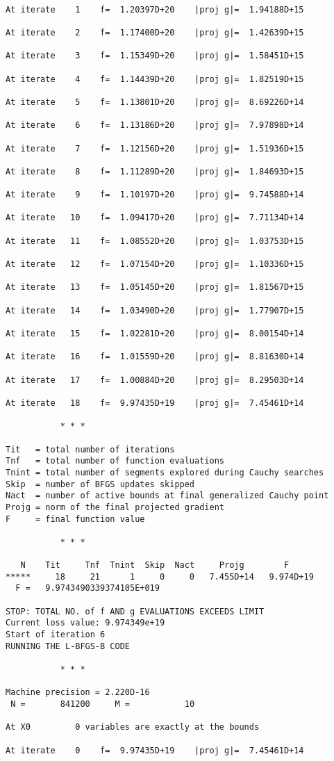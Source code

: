 \documentclass[11pt]{article}
\begin{document}
    \begin{Verbatim}[commandchars=\\\{\}]

At iterate    1    f=  1.20397D+20    |proj g|=  1.94188D+15

At iterate    2    f=  1.17400D+20    |proj g|=  1.42639D+15

At iterate    3    f=  1.15349D+20    |proj g|=  1.58451D+15

At iterate    4    f=  1.14439D+20    |proj g|=  1.82519D+15

At iterate    5    f=  1.13801D+20    |proj g|=  8.69226D+14

At iterate    6    f=  1.13186D+20    |proj g|=  7.97898D+14

At iterate    7    f=  1.12156D+20    |proj g|=  1.51936D+15

At iterate    8    f=  1.11289D+20    |proj g|=  1.84693D+15

At iterate    9    f=  1.10197D+20    |proj g|=  9.74588D+14

At iterate   10    f=  1.09417D+20    |proj g|=  7.71134D+14

At iterate   11    f=  1.08552D+20    |proj g|=  1.03753D+15

At iterate   12    f=  1.07154D+20    |proj g|=  1.10336D+15

At iterate   13    f=  1.05145D+20    |proj g|=  1.81567D+15

At iterate   14    f=  1.03490D+20    |proj g|=  1.77907D+15

At iterate   15    f=  1.02281D+20    |proj g|=  8.00154D+14

At iterate   16    f=  1.01559D+20    |proj g|=  8.81630D+14

At iterate   17    f=  1.00884D+20    |proj g|=  8.29503D+14

At iterate   18    f=  9.97435D+19    |proj g|=  7.45461D+14

           * * *

Tit   = total number of iterations
Tnf   = total number of function evaluations
Tnint = total number of segments explored during Cauchy searches
Skip  = number of BFGS updates skipped
Nact  = number of active bounds at final generalized Cauchy point
Projg = norm of the final projected gradient
F     = final function value

           * * *

   N    Tit     Tnf  Tnint  Skip  Nact     Projg        F
*****     18     21      1     0     0   7.455D+14   9.974D+19
  F =   9.9743490339374105E+019

STOP: TOTAL NO. of f AND g EVALUATIONS EXCEEDS LIMIT
Current loss value: 9.974349e+19
Start of iteration 6
RUNNING THE L-BFGS-B CODE

           * * *

Machine precision = 2.220D-16
 N =       841200     M =           10

At X0         0 variables are exactly at the bounds

At iterate    0    f=  9.97435D+19    |proj g|=  7.45461D+14
    \end{Verbatim}
\end{document}
